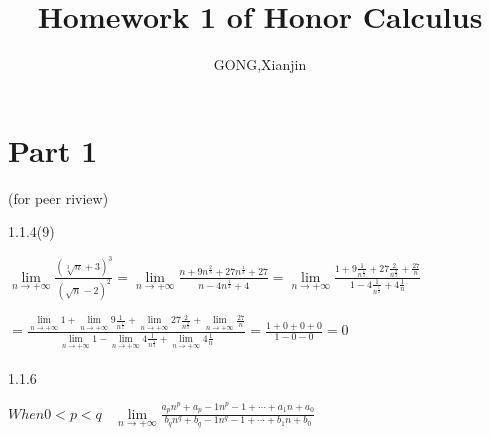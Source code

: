 \documentclass{article}
\author{GONG,Xianjin}
\title{Homework 1 of Honor Calculus}
\begin{document}
\maketitle

\section{Part 1}(for peer riview)

1.1.4(9)

$
   \lim \limits_{n \to +\infty}\frac{(\sqrt[3]{n}+3)^3}{(\sqrt{n}-2)^2}
 = \lim \limits_{n \to +\infty}\frac{n+9n^\frac{2}{3} +27n^\frac{1}{3} +27}{n-4n^\frac{1}{2} +4}
 = \lim \limits_{n \to +\infty}\frac{1+9\frac{1}{n^\frac{1}{3}} +27\frac{2}{n^\frac{2}{3}} +\frac{27}{n}}
                             {1-4\frac{1}{n^\frac{1}{2}} +4\frac{1}{n}}
$

$
 =  \frac {\lim \limits_{n \to +\infty}1
            +\lim \limits_{n \to +\infty}9\frac{1}{n^\frac{1}{3}}
            +\lim \limits_{n \to +\infty}27\frac{2}{n^\frac{2}{3}}
            +\lim \limits_{n \to +\infty}\frac{27}{n}}
            {\lim \limits_{n \to +\infty}1
            -\lim \limits_{n \to +\infty}4\frac{1}{n^\frac{1}{2}}
            +\lim \limits_{n \to +\infty}4\frac{1}{n}
            }
  = \frac{1+0+0+0}{1-0-0}
  = 0
$
\\\\

1.1.6

$
When 0<p<q \ \ \ \ \lim \limits_{n \to +\infty}\frac{a_pn^p+a_p-1n^p-1+\cdots+a_1n+a_0}{b_qn^q+b_q-1n^q-1+\cdots+b_1n+b_0}
$
\end{document}
